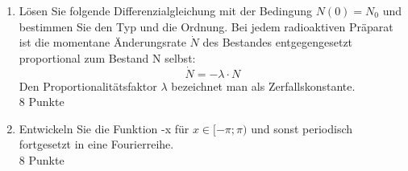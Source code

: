 \documentclass[fleqn]{article}
\begin{document}
\begin{enumerate}
  \item L\"osen Sie folgende Differenzialgleichung mit der Bedingung $N(0)=N_0$ und bestimmen Sie den Typ und die Ordnung. Bei jedem radioaktiven Pr\"aparat ist die momentane \"Anderungsrate $\dot{N}$ des Bestandes entgegengesetzt proportional zum Bestand N selbst:
    \begin{equation}
      \dot{N}=-\lambda\cdot N
    \end{equation}
  Den Proportionalit\"atsfaktor $\lambda$ bezeichnet man als Zerfallskonstante.
  \\8 Punkte
\item Entwickeln Sie die Funktion -x f\"ur $x \in [-\pi;\pi)$ und sonst periodisch fortgesetzt in eine Fourierreihe.
  \\8 Punkte
\end{enumerate}
\end{document}
